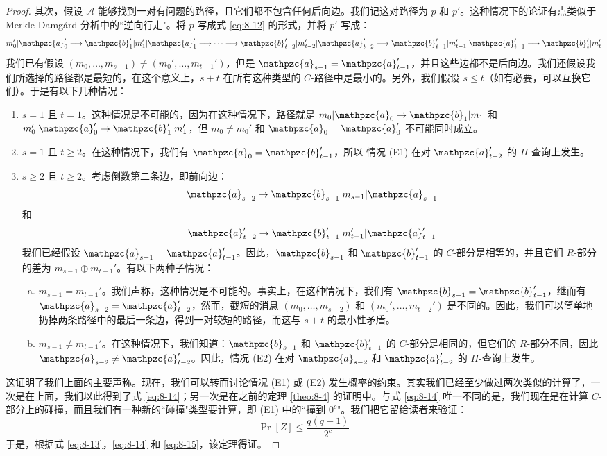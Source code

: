 \begin{proof}
其次，假设 $\mathcal{A}$ 能够找到一对有问题的路径，且它们都不包含任何后向边。我们记这对路径为 $p$ 和 $p'$。这种情况下的论证有点类似于 Merkle-Damg{\aa}rd 分析中的``逆向行走"。将 $p$ 写成式 \ref{eq:8-12} 的形式，并将 $p'$ 写成：
\[
m_0'|\mathpzc{a}_0'\longrightarrow
\mathpzc{b}_1'|m_1'|\mathpzc{a}_1'\longrightarrow\cdots\longrightarrow
\mathpzc{b}_{t-2}'|m_{t-2}'|\mathpzc{a}_{t-2}'\longrightarrow
\mathpzc{b}_{t-1}'|m_{t-1}'|\mathpzc{a}_{t-1}'\longrightarrow
\mathpzc{b}_{t}'|m_{t}'
\]
我们已有假设 $(m_0,\dots,m_{s-1})\neq(m_0',\dots,m_{t-1}')$，但是 $\mathpzc{a}_{s-1}=\mathpzc{a}_{t-1}'$，并且这些边都不是后向边。我们还假设我们所选择的路径都是最短的，在这个意义上，$s+t$ 在所有这种类型的 $C$-路径中是最小的。另外，我们假设 $s\leq t$（如有必要，可以互换它们）。于是有以下几种情况：
\begin{enumerate}
	\item $s=1$ 且 $t=1$。这种情况是不可能的，因为在这种情况下，路径就是 $m_0|\mathpzc{a}_0\to\mathpzc{b}_1|m_1$ 和 $m_0'|\mathpzc{a}_0'\to\mathpzc{b}_1'|m_1'$，但 $m_0\neq m_0'$ 和 $\mathpzc{a}_0=\mathpzc{a}_0'$ 不可能同时成立。
	\item $s=1$ 且 $t\geq 2$。在这种情况下，我们有 $\mathpzc{a}_0=\mathpzc{b}_{t-1}'$，所以 情况 (E1) 在对 $\mathpzc{a}_{t-2}'$ 的 $\Pi$-查询上发生。
	\item $s\geq 2$ 且 $t\geq 2$。考虑倒数第二条边，即前向边：
	\[
	\mathpzc{a}_{s-2}\to\mathpzc{b}_{s-1}|m_{s-1}|\mathpzc{a}_{s-1}
	\]
	和
	\[
	\mathpzc{a}_{t-2}'\to\mathpzc{b}_{t-1}'|m_{t-1}'|\mathpzc{a}_{t-1}'
	\]
	我们已经假设 $\mathpzc{a}_{s-1}=\mathpzc{a}_{t-1}'$。因此，$\mathpzc{b}_{s-1}$ 和 $\mathpzc{b}_{t-1}'$ 的 $C$-部分是相等的，并且它们 $R$-部分的差为 $m_{s-1}\oplus m_{t-1}'$。有以下两种子情况：
	\begin{enumerate}[(a)]
		\item $m_{s-1}=m_{t-1}'$。我们声称，这种情况是不可能的。事实上，在这种情况下，我们有 $\mathpzc{b}_{s-1}= \mathpzc{b}_{t-1}'$，继而有 $\mathpzc{a}_{s-2}=\mathpzc{a}_{t-2}'$，然而，截短的消息 $(m_0,\dots,m_{s-2})$ 和 $(m_0',\dots,m_{t-2}')$ 是不同的。因此，我们可以简单地扔掉两条路径中的最后一条边，得到一对较短的路径，而这与 $s+t$ 的最小性矛盾。
		\item $m_{s-1}\neq m_{t-1}'$。在这种情况下，我们知道：$\mathpzc{b}_{s-1}$ 和 $\mathpzc{b}_{t-1}'$ 的 $C$-部分是相同的，但它们的 $R$-部分不同，因此 $\mathpzc{a}_{s-2}\neq\mathpzc{a}_{t-2}'$。因此，情况 (E2) 在对 $\mathpzc{a}_{s-2}$ 和 $\mathpzc{a}_{t-2}'$ 的 $\Pi$-查询上发生。
	\end{enumerate}
\end{enumerate}

这证明了我们上面的主要声称。现在，我们可以转而讨论情况 (E1) 或 (E2) 发生概率的约束。其实我们已经至少做过两次类似的计算了，一次是在上面，我们以此得到了式 \ref{eq:8-14}；另一次是在之前的定理 \ref{theo:8-4} 的证明中。与式 \ref{eq:8-14} 唯一不同的是，我们现在是在计算 $C$-部分上的碰撞，而且我们有一种新的``碰撞"类型要计算，即 (E1) 中的``撞到 $0^c$"。我们把它留给读者来验证：
\begin{equation}\label{eq:8-15}
\Pr[Z]\leq\frac{q(q+1)}{2^c}
\end{equation}
于是，根据式 \ref{eq:8-13}，\ref{eq:8-14} 和 \ref{eq:8-15}，该定理得证。
\end{proof}

